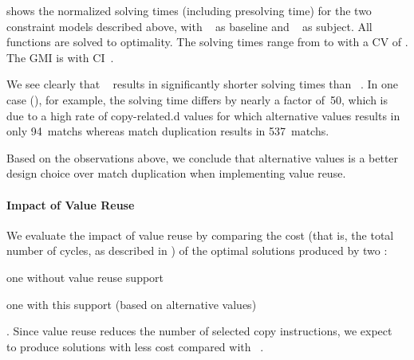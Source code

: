  shows the normalized
solving times (including \gls{presolving} time) for the two \glspl{constraint
  model} described above, with ~
as \gls{baseline} and ~ as
\gls{subject}.
%
All \glspl{function} are solved to optimality.
%
The solving times range from
\printMinSolvingTime{
  \AltValuesVsMatchDupPrePlusSolvingTimeSpeedupSolvingTimeAvgMin,
  \AltValuesVsMatchDupPrePlusSolvingTimeSpeedupBaselineSolvingTimeAvgMin
}
to
\printMaxSolvingTime{
  \AltValuesVsMatchDupPrePlusSolvingTimeSpeedupSolvingTimeAvgMax,
  \AltValuesVsMatchDupPrePlusSolvingTimeSpeedupBaselineSolvingTimeAvgMax
}
with a \gls{CV} of
\numMaxOf{
  \AltValuesVsMatchDupPrePlusSolvingTimeSpeedupPrePlusSolvingTimeCvMax,
  \AltValuesVsMatchDupPrePlusSolvingTimeSpeedupBaselinePrePlusSolvingTimeCvMax
}.
%
The \gls{GMI} is \printGMI{%
  \AltValuesVsMatchDupPrePlusSolvingTimeSpeedupPrePlusSolvingTimeRegularSpeedupGmean%
} with \gls{CI}~\printGMICI{%
  \AltValuesVsMatchDupPrePlusSolvingTimeSpeedupPrePlusSolvingTimeRegularSpeedupCiMin%
}{%
  \AltValuesVsMatchDupPrePlusSolvingTimeSpeedupPrePlusSolvingTimeRegularSpeedupCiMax%
}.

We see clearly that ~ results in
significantly shorter solving times than ~.
%
In one case (), for example, the solving time differs by
nearly a factor of~\num{50}, which is due to a high rate of \gls{copy-related.d}
values for which \glspl{alternative value} results in only
\num{94}~\glspl{match} whereas \gls{match duplication} results in
\num{537}~\glspl{match}.

Based on the observations above, we conclude that \glspl{alternative value} is a
better design choice over \gls{match duplication} when implementing \gls{value
  reuse}.


\paragraph{Impact of Value Reuse}

We evaluate the impact of \gls{value reuse} by comparing the cost (that is, the
total number of cycles, as described in ) of
the optimal \glspl{solution} produced by two :
%
\begin{modelList}
  \item {}
    one without \gls{value reuse} support
  \item {}
    one with this support (based on \glspl{alternative value})
\end{modelList}.
%
Since \gls{value reuse} reduces the number of selected copy \glspl{instruction},
we expect ~ to produce
\glspl{solution} with less cost compared with ~.

